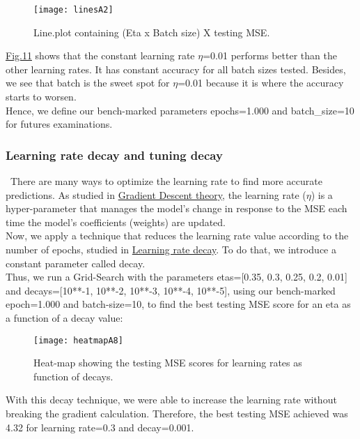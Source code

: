 \begin{figure}[H]
\label{fig:figA6}
\centering
\texttt{[image: linesA2]}
\caption{Line.plot containing (Eta x Batch size) X testing MSE.}
\end{figure}

\hyperref[fig:figA6]{Fig.11} shows that the constant learning rate $\eta$=0.01 performs better than the other learning rates. It has constant accuracy for all batch sizes tested. Besides, we see that batch is the sweet spot for $\eta$=0.01 because it is where the accuracy starts to worsen.\\

Hence, we define our bench-marked parameters epochs=1.000 and batch\_size=10 for futures examinations.

\subsubsection{Learning rate decay and tuning decay}
\label{chap:Learning rate decay and tuning decay}

\qquad \, There are many ways to optimize the learning rate to find more accurate predictions. As studied in \hyperref[chap:Gradient Decedent]{Gradient Descent theory}, the learning rate ($\eta$) is a hyper-parameter that manages the model's change in response to the MSE each time the model's coefficients (weights) are updated.\\

Now, we apply a technique that reduces the learning rate value according to the number of epochs, studied in \hyperref[chap:Learning Rate with decay]{Learning rate decay}. To do that, we introduce a constant parameter called decay.\\

Thus, we run a Grid-Search with the parameters etas=[0.35, 0.3, 0.25, 0.2, 0.01] and decays=[10**-1, 10**-2, 10**-3, 10**-4, 10**-5], using our bench-marked epoch=1.000 and batch-size=10, to find the best testing MSE score for an eta as a function of a decay value:

\begin{figure}[H]
\label{fig:figA7}
\centering
\texttt{[image: heatmapA8]}
\caption{Heat-map showing the testing MSE scores for learning rates as function of decays.}
\end{figure}

With this decay technique, we were able to increase the learning rate without breaking the gradient calculation. Therefore, the best testing MSE achieved was 4.32 for learning rate=0.3 and decay=0.001.\\

